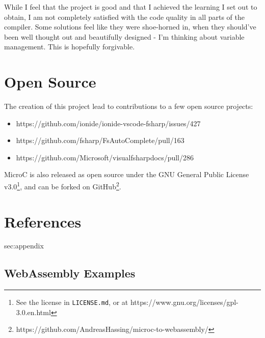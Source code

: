 \documentclass[a4paper]{article}
\begin{document}
\noindent While I feel that the project is good and that I achieved the learning I set out to obtain, I am not completely satisfied with the code quality in all parts of the compiler. Some solutions feel like they were shoe-horned in, when they should've been well thought out and beautifully designed - I'm thinking about variable management. This is hopefully forgivable.

\newpage
\section{Open Source}
\noindent The creation of this project lead to contributions to a few open source projects:
\begin{itemize}
	\item https://github.com/ionide/ionide-vscode-fsharp/issues/427
	\item https://github.com/fsharp/FsAutoComplete/pull/163
	\item https://github.com/Microsoft/visualfsharpdocs/pull/286
\end{itemize}

\noindent MicroC is also released as open source under the GNU General Public License v3.0\footnote{See the license in \texttt{LICENSE.md}, or at https://www.gnu.org/licenses/gpl-3.0.en.html}, and can be forked on GitHub\footnote{https://github.com/AndreasHassing/microc-to-webassembly/}.

\section{References}
\label{sec:references}
\begingroup
\renewcommand{\section}[2]{}%

{}
\endgroup

\newpage
\section{Appendix}
\label{sec:appendix}

\subsection{WebAssembly Examples}
\label{sec:appendix:wasm-examples}
\end{document}

